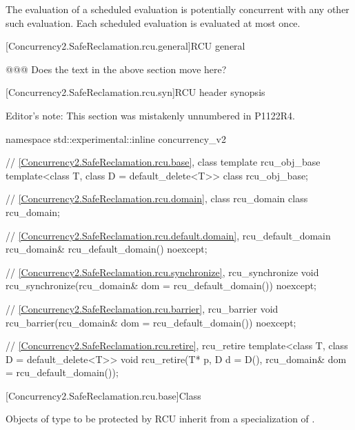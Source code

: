 \pnum
The evaluation of a scheduled evaluation is potentially concurrent with
any other such evaluation. Each scheduled evaluation is evaluated at
most once.

[Concurrency2.SafeReclamation.rcu.general]{RCU general}

@@@ Does the text in the above section move here?

[Concurrency2.SafeReclamation.rcu.syn]{RCU header  synopsis}

Editor's note: This section was mistakenly unnumbered in P1122R4.


\begin{codeblock}
namespace std::experimental::inline concurrency_v2 {
  // \ref{Concurrency2.SafeReclamation.rcu.base}, class template rcu_obj_base
  template<class T, class D = default_delete<T>>
    class rcu_obj_base;

  // \ref{Concurrency2.SafeReclamation.rcu.domain}, class rcu_domain
  class rcu_domain;

  // \ref{Concurrency2.SafeReclamation.rcu.default.domain}, rcu_default_domain
  rcu_domain& rcu_default_domain() noexcept;

  // \ref{Concurrency2.SafeReclamation.rcu.synchronize}, rcu_synchronize
  void rcu_synchronize(rcu_domain& dom = rcu_default_domain()) noexcept;

  // \ref{Concurrency2.SafeReclamation.rcu.barrier}, rcu_barrier
  void rcu_barrier(rcu_domain& dom = rcu_default_domain()) noexcept;

  // \ref{Concurrency2.SafeReclamation.rcu.retire}, rcu_retire
  template<class T, class D = default_delete<T>>
    void rcu_retire(T* p, D d = D(), rcu_domain& dom = rcu_default_domain());
}
\end{codeblock}

[Concurrency2.SafeReclamation.rcu.base]{Class }


Objects of type  to be protected by RCU inherit from a
specialization of .


